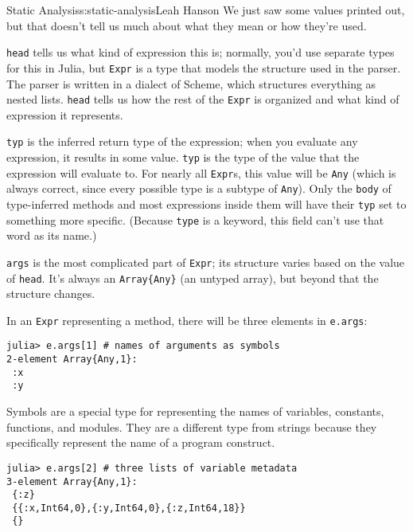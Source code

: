 \begin{aosachapter}{Static Analysis}{s:static-analysis}{Leah Hanson}
We just saw some values printed out, but that doesn't tell us much about
what they mean or how they're used.

\begin{aosaitemize}

\item
  \texttt{head} tells us what kind of expression this is; normally,
  you'd use separate types for this in Julia, but \texttt{Expr} is a
  type that models the structure used in the parser. The parser is
  written in a dialect of Scheme, which structures everything as nested
  lists. \texttt{head} tells us how the rest of the \texttt{Expr} is
  organized and what kind of expression it represents.
\item
  \texttt{typ} is the inferred return type of the expression; when you
  evaluate any expression, it results in some value. \texttt{typ} is the
  type of the value that the expression will evaluate to. For nearly all
  \texttt{Expr}s, this value will be \texttt{Any} (which is always
  correct, since every possible type is a subtype of \texttt{Any}). Only
  the \texttt{body} of type-inferred methods and most expressions inside
  them will have their \texttt{typ} set to something more specific.
  (Because \texttt{type} is a keyword, this field can't use that word as
  its name.)
\item
  \texttt{args} is the most complicated part of \texttt{Expr}; its
  structure varies based on the value of \texttt{head}. It's always an
  \texttt{Array\{Any\}} (an untyped array), but beyond that the
  structure changes.
\end{aosaitemize}

In an \texttt{Expr} representing a method, there will be three elements
in \texttt{e.args}:

\begin{verbatim}
julia> e.args[1] # names of arguments as symbols
2-element Array{Any,1}:
 :x
 :y
\end{verbatim}

Symbols are a special type for representing the names of variables,
constants, functions, and modules. They are a different type from
strings because they specifically represent the name of a program
construct.

\begin{verbatim}
julia> e.args[2] # three lists of variable metadata
3-element Array{Any,1}:
 {:z}                                     
 {{:x,Int64,0},{:y,Int64,0},{:z,Int64,18}}
 {}                                       
\end{verbatim}


\end{aosachapter}
